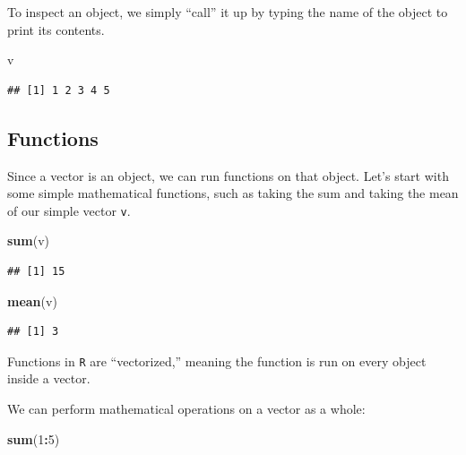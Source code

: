 \documentclass[]{book}
\newenvironment{Shaded}{\begin{snugshade}}{\end{snugshade}}
\newcommand{\KeywordTok}[1]{\textcolor[rgb]{0.13,0.29,0.53}{\textbf{#1}}}
\newcommand{\DecValTok}[1]{\textcolor[rgb]{0.00,0.00,0.81}{#1}}
\newcommand{\OperatorTok}[1]{\textcolor[rgb]{0.81,0.36,0.00}{\textbf{#1}}}
\newcommand{\NormalTok}[1]{#1}
\theoremstyle{definition}
\theoremstyle{definition}
\theoremstyle{definition}
\theoremstyle{remark}
\begin{document}
To inspect an object, we simply ``call'' it up by typing the name of the
object to print its contents.

\begin{Shaded}
\begin{Highlighting}[]
\NormalTok{v}
\end{Highlighting}
\end{Shaded}

\begin{verbatim}
## [1] 1 2 3 4 5
\end{verbatim}

\subsection{Functions}\label{functions}

Since a vector is an object, we can run functions on that object. Let's
start with some simple mathematical functions, such as taking the sum
and taking the mean of our simple vector \texttt{v}.

\begin{Shaded}
\begin{Highlighting}[]
\KeywordTok{sum}\NormalTok{(v)}
\end{Highlighting}
\end{Shaded}

\begin{verbatim}
## [1] 15
\end{verbatim}

\begin{Shaded}
\begin{Highlighting}[]
\KeywordTok{mean}\NormalTok{(v)}
\end{Highlighting}
\end{Shaded}

\begin{verbatim}
## [1] 3
\end{verbatim}

Functions in \texttt{R} are ``vectorized,'' meaning the function is run
on every object inside a vector.

We can perform mathematical operations on a vector as a whole:

\begin{Shaded}
\begin{Highlighting}[]
\KeywordTok{sum}\NormalTok{(}\DecValTok{1}\OperatorTok{:}\DecValTok{5}\NormalTok{)}
\end{Highlighting}
\end{Shaded}
\end{document}
